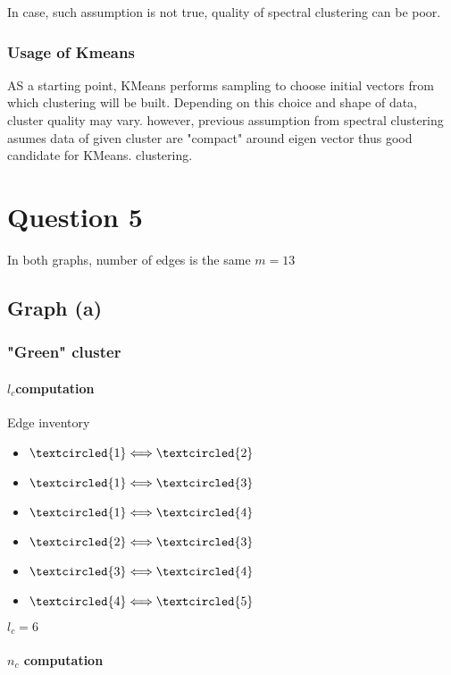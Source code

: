 \documentclass[a4paper]{article}
\begin{document}
In case, such assumption is not true, quality of spectral clustering can be poor.

\subsubsection{Usage of Kmeans}

AS a starting point, KMeans performs sampling to choose initial vectors from which clustering will be built. Depending on this choice and shape of data, cluster quality may vary. however, previous assumption from spectral clustering asumes data of given cluster are "compact" around eigen vector thus good candidate for KMeans. clustering.


\section{Question 5}

In both graphs, number of edges is the same $\boxed{m = 13}$

\subsection{Graph (a)}

\subsubsection{ "Green" cluster}

\paragraph{$l_{c}$computation}

Edge inventory
\begin{itemize}
\item $\textcircled{1}\Longleftrightarrow \textcircled{2}$
\item $\textcircled{1}\Longleftrightarrow \textcircled{3}$
\item $\textcircled{1}\Longleftrightarrow \textcircled{4}$
\item $\textcircled{2}\Longleftrightarrow \textcircled{3}$
\item $\textcircled{3}\Longleftrightarrow \textcircled{4}$
\item $\textcircled{4}\Longleftrightarrow \textcircled{5}$
\end{itemize}
$\boxed{l_{c}=6}$
\paragraph{$n_{c}$ computation}
\end{document}
